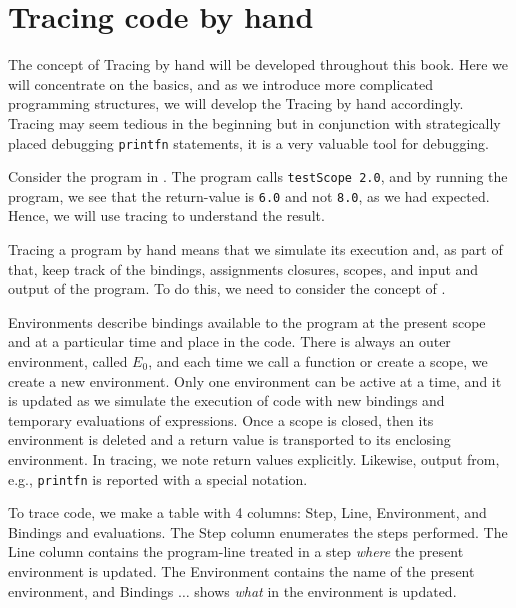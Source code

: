 \documentclass[fsharpNotes.tex]{subfiles}
\begin{document}
\section{Tracing code by hand}
\label{sec:tracing}
The concept of Tracing by hand will be developed throughout this book. Here we will concentrate on the basics, and as we introduce more complicated programming structures, we will develop the Tracing by hand accordingly. Tracing may seem tedious in the beginning but in conjunction with strategically placed debugging \lstinline!printfn! statements, it is a very valuable tool for debugging.

Consider the program in .
%
%
The program calls \lstinline{testScope 2.0}, and by running the program, we see that the return-value is \lstinline{6.0} and not \lstinline{8.0}, as we had expected. Hence, we will use tracing to understand the result.

Tracing a program by hand means that we simulate its execution and, as part of that, keep track of the bindings, assignments closures, scopes, and input and output of the program. To do this, we need to consider the concept of .

Environments describe bindings available to the program at the present scope and at a particular time and place in the code. There is always an outer environment, called $E_0$, and each time we call a function or create a scope, we create a new environment. Only one environment can be active at a time, and it is updated as we simulate the execution of code with new bindings and temporary evaluations of expressions. Once a scope is closed, then its environment is deleted and a return value is transported to its enclosing environment. In tracing, we note return values explicitly. Likewise, output from, e.g., \lstinline{printfn} is reported with a special notation.

To trace code, we make a table with 4 columns: Step, Line, Environment, and Bindings and evaluations. The Step column enumerates the steps performed. The Line column contains the program-line treated in a step {\em where} the present environment is updated. The Environment contains the name of the present environment, and Bindings $\ldots$ shows {\em what}  in the environment is updated.
\end{document}
